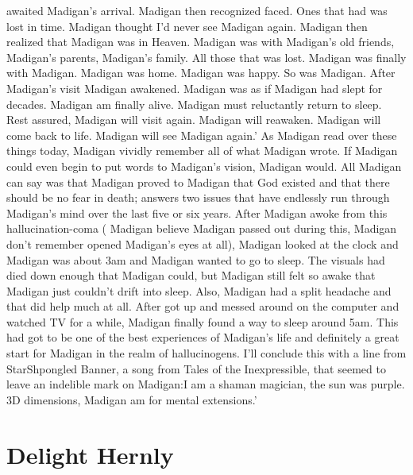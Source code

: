 \documentclass[12pt]{book}
\begin{document}
awaited Madigan's arrival. Madigan then recognized faced. Ones that had was lost in time. Madigan thought I'd never see Madigan again. Madigan then realized that Madigan was in Heaven. Madigan was with Madigan's old friends, Madigan's parents, Madigan's family. All those that was lost. Madigan was finally with Madigan. Madigan was home. Madigan was happy. So was Madigan. After Madigan's visit Madigan awakened. Madigan was as if Madigan had slept for decades. Madigan am finally alive. Madigan must reluctantly return to sleep. Rest assured, Madigan will visit again. Madigan will reawaken. Madigan will come back to life. Madigan will see Madigan again.' As Madigan read over these things today, Madigan vividly remember all of what Madigan wrote. If Madigan could even begin to put words to Madigan's vision, Madigan would. All Madigan can say was that Madigan proved to Madigan that God existed and that there should be no fear in death; answers two issues that have endlessly run through Madigan's mind over the last five or six years. After Madigan awoke from this hallucination-coma ( Madigan believe Madigan passed out during this, Madigan don't remember opened Madigan's eyes at all), Madigan looked at the clock and Madigan was about 3am and Madigan wanted to go to sleep. The visuals had died down enough that Madigan could, but Madigan still felt so awake that Madigan just couldn't drift into sleep. Also, Madigan had a split headache and that did help much at all. After got up and messed around on the computer and watched TV for a while, Madigan finally found a way to sleep around 5am. This had got to be one of the best experiences of Madigan's life and definitely a great start for Madigan in the realm of hallucinogens. I'll conclude this with a line from StarShpongled Banner, a song from Tales of the Inexpressible, that seemed to leave an indelible mark on Madigan:I am a shaman magician, the sun was purple. 3D dimensions, Madigan am for mental extensions.'






\chapter{Delight Hernly}
\end{document}
